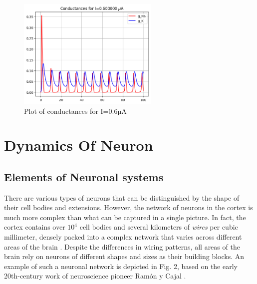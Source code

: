 \documentclass[12pt,a4paper]{report}
\begin{document}
\begin{figure}[H]
    \centering
    \includegraphics[width=0.6\textwidth]{./data/conductances_0_6uA.png}
    \caption{Plot of conductances for I=0.6µA}
    \label{fig:conductances_0_6uA}
\end{figure}


\chapter{Dynamics Of Neuron}

\section{Elements of Neuronal systems}

There are various types of neurons that can be distinguished by the shape of their cell bodies and extensions. However, the network of neurons in the cortex is much more complex than what can be captured in a single picture. In fact, the cortex contains over \(10^{4}\) cell bodies and several kilometers of \textit{wires} per cubic millimeter, densely packed into a complex network that varies across different areas of the brain \cite{ref1}. Despite the differences in wiring patterns, all areas of the brain rely on neurons of different shapes and sizes as their building blocks. An example of such a neuronal network is depicted in Fig. 2, based on the early 20th-century work of neuroscience pioneer Ramón y Cajal \cite{ref1}.
\end{document}
